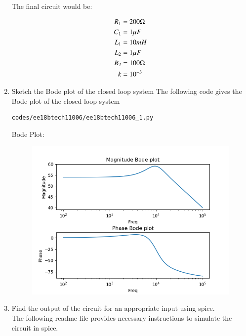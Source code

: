 \begin{enumerate}[label=\arabic*.,ref=\theenumi]
\begin{align}
\end{align}
The final circuit would be:
\begin{figure}[!ht]
	\begin{center}
		\resizebox{\columnwidth}{!}{}
	\end{center}
\caption{}
\label{fig:ee18btech11006_6}
\end{figure}
\begin{align}
R_1&= 200\ohm \\
C_1&= 1\mu F\\
L_1&= 10mH \\
L_2&=1\mu F\\
R_2&=100\ohm\\
k&=10^{-3}
\end{align}
\item Sketch the Bode plot of the closed loop system
\solution The following code gives the Bode plot of the closed loop system
\begin{lstlisting}
codes/ee18btech11006/ee18btech11006_1.py
\end{lstlisting}
Bode Plot:
\begin{figure}[ht!]
\centering
\includegraphics[width=\columnwidth]{./figs/ee18btech11006/ee18btech11006_7.png}
\caption{}
\label{fig:ee18btech11006_7}
\end{figure}
\item Find the output of the circuit for an appropriate input using spice.\\
\solution
The following readme file provides necessary instructions to simulate the circuit in spice.
\begin{lstlisting}

\end{lstlisting}
\end{enumerate}
